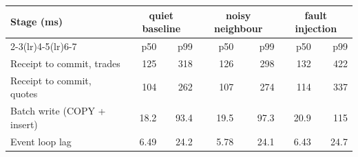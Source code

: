\begin{tabular}{lrrrrrr}
\toprule
Stage (ms) & \multicolumn{2}{c}{quiet baseline} & \multicolumn{2}{c}{noisy neighbour} & \multicolumn{2}{c}{fault injection} \\
\cmidrule(lr){2-3}\cmidrule(lr){4-5}\cmidrule(lr){6-7}
 & p50 & p99 & p50 & p99 & p50 & p99 \\
\midrule
Receipt to commit, trades & 125 & 318 & 126 & 298 & 132 & 422 \\
Receipt to commit, quotes & 104 & 262 & 107 & 274 & 114 & 337 \\
Batch write (COPY + insert) & 18.2 & 93.4 & 19.5 & 97.3 & 20.9 & 115 \\
Event loop lag & 6.49 & 24.2 & 5.78 & 24.1 & 6.43 & 24.7 \\
\bottomrule
\end{tabular}
